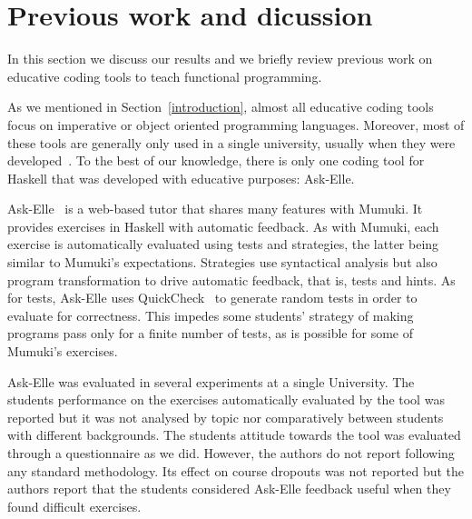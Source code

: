 \section{Previous work and dicussion} \label{previous-work}



In this section we discuss our results and we briefly review previous work on educative coding tools to teach functional programming. 

As we mentioned in Section~\ref{introduction}, almost all educative coding tools focus on imperative or object oriented programming languages. Moreover, most of these tools are generally only used in a single  university, usually when they were developed~\cite{brusilovsky2014increasing}. To the best of our knowledge, there is only one coding tool for Haskell that was developed with educative purposes: Ask-Elle.  


Ask-Elle~\cite{Gerdes:2012,gerdes2016ask} is a web-based tutor
that shares many features with Mumuki. It provides exercises in Haskell with automatic feedback. As with Mumuki, each exercise is automatically evaluated using tests and strategies, the latter
being similar to Mumuki's expectations. Strategies use syntactical analysis but also program
transformation to drive automatic feedback, that is, tests and hints.
As for tests, Ask-Elle uses QuickCheck~\cite{Claessen2000} to generate random tests in order to evaluate for correctness. This
impedes some students' strategy of making programs pass only for a finite number of tests,
as is possible for some of Mumuki's exercises.

Ask-Elle was evaluated in several experiments at a single University. The students performance on the exercises  automatically evaluated by the tool was reported but it was not analysed by topic nor comparatively between students with different backgrounds. The students attitude towards the tool was evaluated through a questionnaire as we did. However, the authors do not report following any standard methodology. Its effect on course dropouts was not reported but the authors report that the students considered Ask-Elle feedback useful when they found difficult exercises.  

